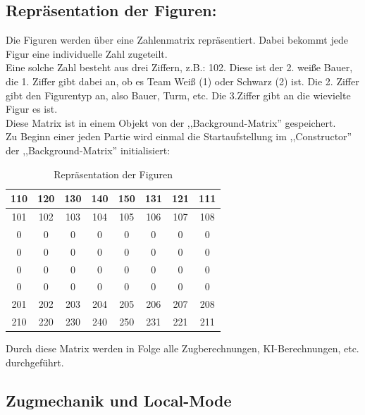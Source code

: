 \documentclass[12pt,a4paper]{article}
\begin{document}
{\subsection{Repräsentation der Figuren:}

Die Figuren werden über eine Zahlenmatrix repräsentiert. Dabei bekommt jede Figur eine individuelle Zahl zugeteilt. \\
Eine solche Zahl besteht aus drei Ziffern, z.B.: 102. Diese ist der 2. weiße Bauer, die 1. Ziffer gibt dabei an, ob es Team Weiß (1) oder Schwarz (2) ist. Die 2. Ziffer gibt den Figurentyp an, also Bauer, Turm, etc. Die 3.Ziffer gibt an die wievielte Figur es ist. \\
Diese Matrix ist in einem Objekt von der ,,Background-Matrix'' gespeichert. \\
Zu Beginn einer jeden Partie wird einmal die Startaufstellung im ,,Constructor'' der ,,Background-Matrix'' initialisiert:

	\begin{table}[H]
		\centering
		\begin{tabular}{| c | c | c | c | c | c | c | c |}
			\hline
			110 & 120 	& 	130 & 140 	& 150 	& 131 	& 121 	& 	111 \\ \hline
			101 & 102 	& 	103 & 	104 & 	105 & 	106 & 	107 & 	108 \\ \hline
			0	&	0	& 	0	&	0	&	0	&	0	&	0	&	0	\\ \hline
			0	&	0	& 	0	&	0	&	0	&	0	&	0	&	0 	\\ \hline
			0	&	0	& 	0	&	0	&	0	&	0	&	0	&	0 	\\ \hline
			0	&	0	& 	0	&	0	&	0	&	0	&	0	&	0 	\\ \hline
			201 &	202 &	203	&	204	&	205	&	206	&	207	&	208	\\ \hline
			210 & 	220	&	230	&	240	&	250	&	231	&	221	&	211 \\ 
			\hline	
		\end{tabular}
		\caption{Repräsentation der Figuren}
		\label{TABLE:REPRESENTATION-MEEPLES}
	\end{table}

Durch diese Matrix werden in Folge alle Zugberechnungen, KI-Berechnungen, etc. durchgeführt. \\


\subsection{Zugmechanik und Local-Mode}
\label{SUBSEC:LOCAL_MODE}

}
\end{document}
